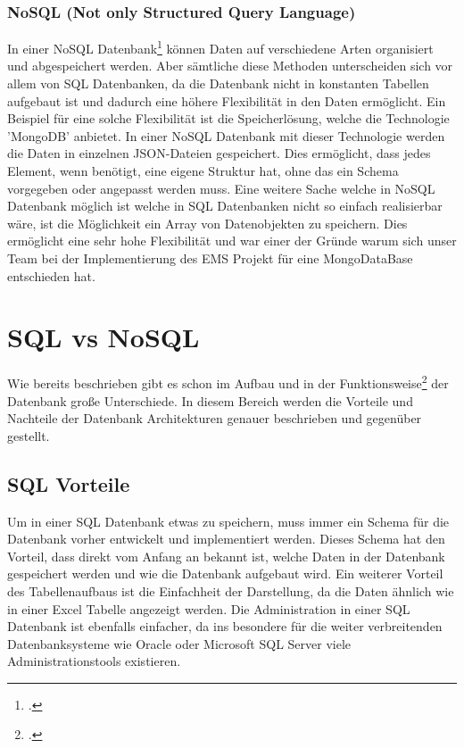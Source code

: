 \subsubsection{NoSQL (Not only Structured Query Language)}	
In einer NoSQL Datenbank\footcite{mongodb} können Daten auf verschiedene Arten organisiert und abgespeichert werden. 
Aber sämtliche diese Methoden unterscheiden sich vor allem von SQL Datenbanken, da die Datenbank nicht in konstanten Tabellen aufgebaut ist und dadurch eine höhere Flexibilität in den Daten ermöglicht. 
Ein Beispiel für eine solche Flexibilität ist die Speicherlösung, welche die Technologie 'MongoDB' anbietet. In einer NoSQL Datenbank mit dieser Technologie werden die Daten in einzelnen JSON-Dateien gespeichert. 
Dies ermöglicht, dass jedes Element, wenn benötigt, eine eigene Struktur hat, ohne das ein Schema vorgegeben oder angepasst werden muss. 
Eine weitere Sache welche in NoSQL Datenbank möglich ist welche in SQL Datenbanken nicht so einfach realisierbar wäre, ist die Möglichkeit ein Array von Datenobjekten zu speichern. 
Dies ermöglicht eine sehr hohe Flexibilität und war einer der Gründe warum sich unser Team bei der Implementierung des EMS Projekt für eine MongoDataBase entschieden hat.
\section{SQL vs NoSQL} 
Wie bereits beschrieben gibt es schon im Aufbau und in der Funktionsweise\footcite{sqlvsnosql} der Datenbank große Unterschiede. 
In diesem Bereich werden die Vorteile und Nachteile der Datenbank Architekturen genauer beschrieben und gegenüber gestellt.
\subsection{SQL Vorteile}
Um in einer SQL Datenbank etwas zu speichern, muss immer ein Schema für die Datenbank vorher entwickelt und implementiert werden. 
Dieses Schema hat den Vorteil, dass direkt vom Anfang an bekannt ist, welche Daten in der Datenbank gespeichert werden und wie die Datenbank aufgebaut wird. 
Ein weiterer Vorteil des Tabellenaufbaus ist die Einfachheit der Darstellung, da die Daten ähnlich wie in einer Excel Tabelle angezeigt werden. 
Die Administration in einer SQL Datenbank ist ebenfalls einfacher, da ins besondere für die weiter verbreitenden Datenbanksysteme wie Oracle oder Microsoft SQL Server viele Administrationstools existieren.

